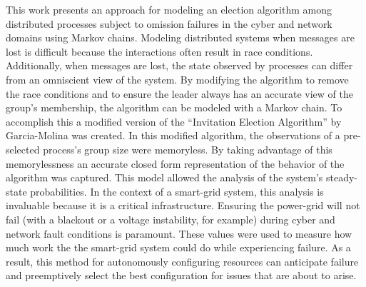 This work presents an approach for modeling an election algorithm among distributed processes subject to omission failures in the cyber and network domains using Markov chains.
Modeling distributed systems when messages are lost is difficult because the interactions often result in race conditions.
Additionally, when messages are lost, the state observed by processes can differ from an omniscient view of the system.
By modifying the algorithm to remove the race conditions and to ensure the leader always has an accurate view of the group's membership, the algorithm can be modeled with a Markov chain.
To accomplish this a modified version of the ``Invitation Election Algorithm'' by Garcia-Molina was created.
In this modified algorithm, the observations of a pre-selected process's group size were memoryless.
By taking advantage of this memorylessness an accurate closed form representation of the behavior of the algorithm was captured.
This model allowed the analysis of the system's steady-state probabilities.
In the context of a smart-grid system, this analysis is invaluable because it is a critical infrastructure.
Ensuring the power-grid will not fail (with a blackout or a voltage instability, for example) during cyber and network fault conditions is paramount.
These values were used to measure how much work the the smart-grid system could do while experiencing failure.
As a result, this method for autonomously configuring resources can anticipate failure and preemptively select the best configuration for issues that are about to arise.

